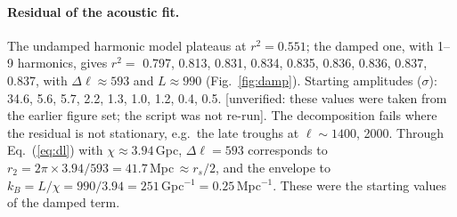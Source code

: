 \documentclass[10pt,twocolumn]{article}
\newcommand{\flag}[1]{\textsf{[unverified: #1]}}
\begin{document}
\paragraph{Residual of the acoustic fit.} The undamped harmonic model plateaus at $r^2=0.551$; the damped one, with 1--9 harmonics, gives $r^2=$ 0.797, 0.813, 0.831, 0.834, 0.835, 0.836, 0.836, 0.837, 0.837, with $\Delta\ell\approx593$ and $L\approx990$ (Fig.~\ref{fig:damp}). Starting amplitudes ($\sigma$): 34.6, 5.6, 5.7, 2.2, 1.3, 1.0, 1.2, 0.4, 0.5. \flag{these values were taken from the earlier figure set; the script was not re-run}. The decomposition fails where the residual is not stationary, e.g.\ the late troughs at $\ell\sim1400$, 2000. Through Eq.~(\ref{eq:dl}) with $\chi\approx3.94$\,Gpc, $\Delta\ell=593$ corresponds to $r_2=2\pi\times3.94/593=41.7$\,Mpc$\,\approx r_s/2$, and the envelope to $k_B=L/\chi=990/3.94=251$\,Gpc$^{-1}=0.25$\,Mpc$^{-1}$. These were the starting values of the damped term.
\end{document}
